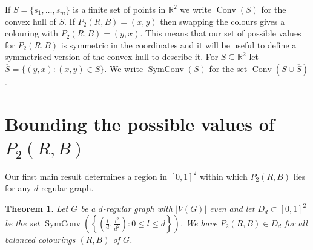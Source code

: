 \documentclass[12pt,a4paper]{article}
\newcommand{\R}{\mathbb R}
\DeclareMathOperator{\ch}{Conv}
\DeclareMathOperator{\sch}{SymConv}
\newtheorem{thm}{Theorem}
\begin{document}
If $S=\{s_1,\ldots,s_m\}$ is a finite set of points in $\R^2$ we write $\ch(S)$ for the convex hull of $S$. If $P_2(R,B)=(x,y)$ then swapping the colours gives a colouring with $P_2(R,B)=(y,x)$. This means that our set of possible values for $P_2(R,B)$ is symmetric in the coordinates and it will be useful to define a symmetrised version of the convex hull to describe it. For $S\subseteq\R^2$ let $\overline{S}=\{(y,x) : (x,y)\in S\}$. We write $\sch(S)$ for the set $\ch(S\cup\overline{S})$. 

\section{Bounding the possible values of $P_2(R,B)$}

Our first main result determines a region in $[0,1]^2$ within which $P_2(R,B)$ lies for any $d$-regular graph.

\begin{thm}\label{main:thm}
Let $G$ be a $d$-regular graph with $|V(G)|$ even and let $D_d \subset [0,1]^2$ be the set $\sch\left(\left\{\left(\frac{l}{d},\frac{l^2}{d^2}\right):0 \leq l \leq d\right\}\right)$. We have $P_2(R,B)\in D_d$ for all balanced colourings $(R,B)$ of $G$. 
\end{thm}
\end{document}
